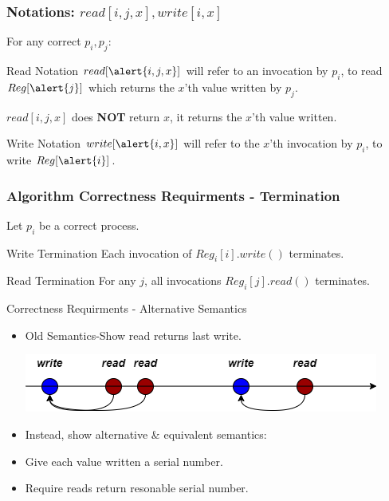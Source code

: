 \begin{frame}
    \frametitle{Notations: $read[i,j,x], write[i,x]$}
    For any correct $p_i, p_j$:
    \begin{block}{Read Notation}
        $read[\alert{i,j,x}]$ will refer to an invocation by $p_i$, to read $Reg[\alert{j}]$
        which returns the \alert{$x$}'th value written by \alert{$p_j$}.
    \end{block}
    \pause
    $read[i,j,x]$ does \textbf{NOT} return $x$, it returns the $x$'th value written.
    \pause
    \begin{block}{Write Notation}
        $write[\alert{i,x}]$ will refer to the \alert{$x$}'th invocation by \alert{$p_i$}, to write $Reg[\alert{i}]$.
    \end{block}
\end{frame}
\begin{frame}
    \frametitle{Algorithm Correctness Requirments - Termination}
    Let $p_i$ be a correct process.
    \begin{block}{Write Termination}
        Each invocation of $Reg_i[i].write()$ terminates.
    \end{block}
    \begin{block}{Read Termination}
        For any $j$, all invocations $Reg_i[j].read()$ terminates.
    \end{block}
\end{frame}
\begin{frame}{Correctness Requirments - Alternative Semantics}
    \begin{itemize}
        \item Old Semantics-Show read returns last write.
        \begin{center}
            \includegraphics[scale=.4]{resources/vanilla_semantics.png}
        \end{center}
        \pause
        \item Instead, show alternative \& equivalent semantics:
        \item Give each value written a serial number.
        \item Require reads return resonable serial number.
    \end{itemize}
    
\end{frame}

